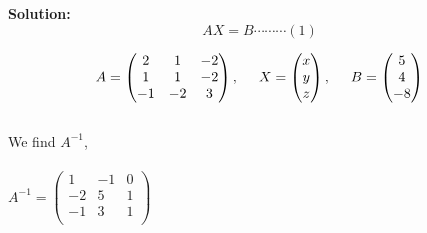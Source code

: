 \documentclass[11pt,a4paper]{article}
\begin{document}
\begin{enumerate}
\textbf{Solution:}
$$AX=B\cdots \cdots \cdots (1)$$

$$A=
\begin{pmatrix}
2 & 1 & -2\\
1 & 1 & -2\\
-1 & -2 & 3\\
\end{pmatrix}
,\hspace{0.5cm}
X=
\begin{pmatrix}
x\\y\\z\\
\end{pmatrix}
,\hspace{0.5cm}
B=
\begin{pmatrix}
5\\ 4 \\ -8\\
\end{pmatrix}
$$\\

We find $A^{-1}$,\\\\
$A^{-1}=
\begin{pmatrix}
1 & -1 & 0\\
-2 & 5 & 1\\
-1 & 3 & 1\\
\end{pmatrix}
$\\\\


\end{enumerate}
\end{document}
